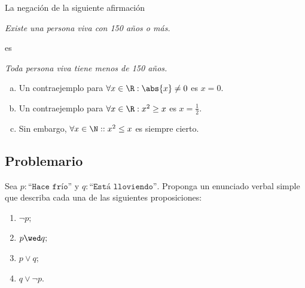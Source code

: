  \begin{ejemplo}
  \label{lip:exmp:4.10.b}
  La negación de la siguiente afirmación
  \begin{center}
   \emph{Existe una persona viva con 150 a\~nos o más.}
  \end{center}
 es 
 \begin{center}
  \emph{Toda persona viva tiene menos de 150 a\~nos.}
 \end{center}

 \end{ejemplo}








 \begin{ejemplo}
 \label{lip:4.11}
  \begin{enumerate}[(a)]
   \item 
  Un contraejemplo para $\forall x \in \R: \abs{x}\neq 0$ es $x=0.$  
   \item 
  Un contraejemplo para $\forall x \in \R: x^{2}\geq x$ es $x=\frac{1}{2}.$  
   \item 
  Sin embargo, $\forall x \in \N: : x^{2}\leq x$ es siempre cierto.
  \end{enumerate}

 \end{ejemplo}



\subsection{Problemario}



 \begin{problema}
  Sea $p:\texttt{``Hace frío''}$ y $q:\texttt{``Está lloviendo''.}$ Proponga un enunciado verbal simple que describa cada una de las siguientes proposiciones:
  \begin{enumerate}
   \item $\neg p;$
   \item $p \wed q;$
   \item $p \vee q;$
   \item $q \vee \neg p.$
  \end{enumerate}

 \end{problema}




